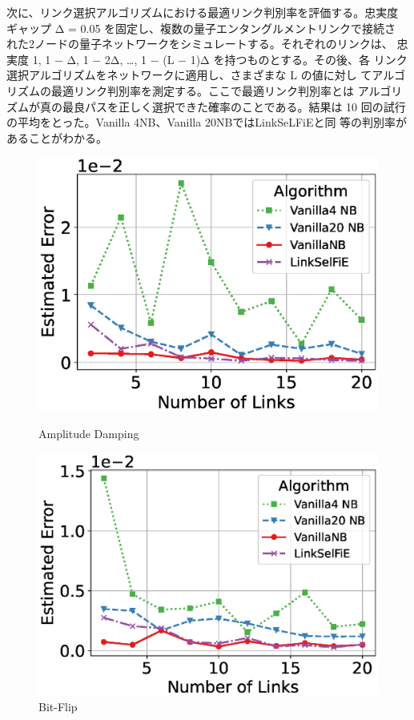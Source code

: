 \documentclass[twocolumn,a4paper,dvipdfmx]{ieicejsp}
\begin{document}
次に、リンク選択アルゴリズムにおける最適リンク判別率を評価する。忠実度
ギャップ Δ = 0.05 を固定し、複数の量子エンタングルメントリンクで接続さ
れた2ノードの量子ネットワークをシミュレートする。それぞれのリンクは、
忠実度 1, 1 − Δ, 1 − 2Δ, …, 1 − (L − 1)Δ を持つものとする。その後、各
リンク選択アルゴリズムをネットワークに適用し、さまざまな L の値に対し
てアルゴリズムの最適リンク判別率を測定する。ここで最適リンク判別率とは
アルゴリズムが真の最良パスを正しく選択できた確率のことである。結果は
10 回の試行の平均をとった。Vanilla 4NB、Vanilla 20NBではLinkSeLFiEと同
等の判別率があることがわかる。
\begin{figure}[h]
\centering
\begin{minipage}[b]{0.45\columnwidth}
\centering
\includegraphics[width=\textwidth]{figure/plot_error_vs_path_num_AmplitudeDamping.eps}
\caption{\small Amplitude Damping}\end{minipage}
\hfill
\begin{minipage}[b]{0.45\columnwidth}
\centering
\includegraphics[width=\textwidth]{figure/plot_error_vs_path_num_BitFlip.eps}
\caption{\small Bit-Flip}\end{minipage}
\end{figure}
\end{document}
